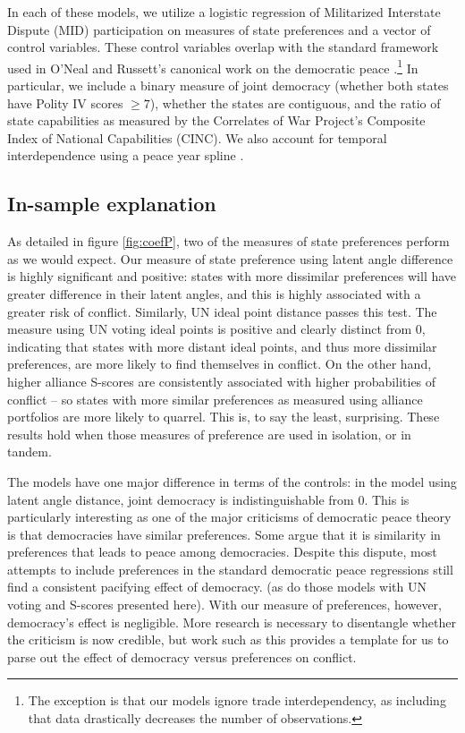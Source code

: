 In each of these models, we utilize a logistic regression of Militarized Interstate Dispute (MID) participation on measures of state preferences and a vector of control variables. These control variables overlap with the standard framework used in O'Neal and Russett's canonical work on the democratic peace \citep{oneal:russett:1997}.\footnote{The exception is that our models ignore trade interdependency, as including that data drastically decreases the number of observations.} In particular, we include a binary measure of joint democracy (whether both states have Polity IV scores $\geq 7$), whether the states are contiguous, and the ratio of state capabilities as measured by the Correlates of War Project's Composite Index of National Capabilities (CINC). We also account for temporal interdependence using a peace year spline \citep{carter:signorino:2010}. 

\subsection*{In-sample explanation}

As detailed in figure \ref{fig:coefP}, two of the measures of state preferences perform as we would expect. Our measure of state preference using latent angle difference is highly significant and positive: states with more dissimilar preferences will have greater difference in their latent angles, and this is highly associated with a greater risk of conflict. Similarly, UN ideal point distance passes this test. The measure using UN voting ideal points is positive and clearly distinct from $0$, indicating that states with more distant ideal points, and thus more dissimilar preferences, are more likely to find themselves in conflict. On the other hand, higher alliance S-scores are consistently associated with higher probabilities of conflict -- so states with more similar preferences as measured using alliance portfolios are more likely to quarrel. This is, to say the least, surprising. These results hold when those measures of preference are used in isolation, or in tandem.

The models have one major difference in terms of the controls: in the model using latent angle distance, joint democracy is indistinguishable from $0$. This is particularly interesting as one of the major criticisms of democratic peace theory is that democracies have similar preferences. Some argue that it is similarity in preferences that leads to peace among democracies.  Despite this dispute, most attempts to include preferences in the standard democratic peace regressions still find a consistent pacifying effect of democracy.
(as do those models with UN voting and S-scores presented here). With our measure of preferences, however, democracy's effect is negligible. More research is necessary to disentangle whether the criticism is now credible, but work such as this provides a template for us to parse out the effect of democracy versus preferences on conflict.



